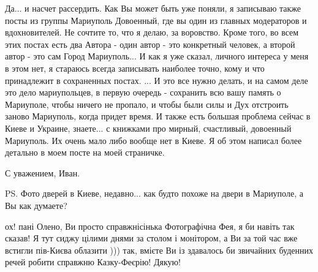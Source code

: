 Да... и насчет рассердить. Как Вы может быть уже поняли, я записываю также
посты из группы Мариуполь Довоенный, где вы один из главных модераторов и
вдохновителей. Не сочтите то, что я делаю, за воровство. Кроме того, во всем
этих постах есть два Автора - один автор - это конкретный человек, а второй
автор - это сам Город Мариуполь... И как я уже сказал, личного интереса у меня
в этом нет, я стараюсь всегда записывать наиболее точно, кому и что принадлежит
в сохраненных постах.  ... И это все нужно делать, и на самом деле это дело
мариупольцев, в первую очередь - сохранить всю вашу память о Мариуполе,  чтобы
ничего не пропало, и чтобы были силы и Дух отстроить заново Мариуполь, когда
придет время.  И также есть большая проблема сейчас в Киеве и Украине,
знаете... с книжками про мирный, счастливый, довоенный Мариуполь. Их очень мало
либо вообще нет в Киеве.  Я об этом написал более детально в моем посте на моей
страничке. 

С уважением, Иван.

PS. Фото дверей в Киеве, недавно... как будто похоже на двери в Мариуполе,
а Вы как думаете?

ох! пані Олено, Ви просто справжнісінька Фотографічна Фея, я би навіть так
сказав! Я тут сиджу цілими днями за столом і монітором, а Ви за той час вже
встигли пів-Києва облазити ))) так, вмієте Ви із здавалось би звичайних
буденних речей робити справжню Казку-Феєрію! Дякую!
